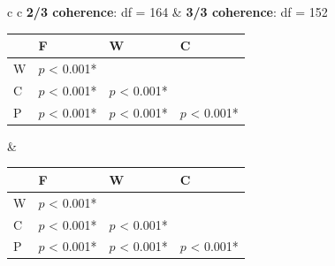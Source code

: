 \documentclass[man,floatsintext]{apa6}
\begin{document}
\begin{figure}[h]
\begin{center}
\begin{tabular}{ c c}
      \textbf{2/3 coherence}: df = 164 & \textbf{3/3 coherence}: df = 152\\

      {







        \small
        \begin{tabular}{| l | l |  l | l |}
          \hline
          & F                           & W                         & C \\ 
          \hline
          W &  $p$ < 0.001*  &                           &\\
          \hline
          C &  $p$ < 0.001*  &  $p$ < 0.001*  &\\
          \hline
          P &  $p$ < 0.001* &  $p$ < 0.001*  &  $p$ < 0.001*\\
          \hline
        \end{tabular}
      } & 

      {






        \small
        \begin{tabular}{| l | l |  l | l |}
          \hline
          & F                            & W                         & C \\ 
          \hline
          W &  $p$ < 0.001*  &                           &\\
          \hline
          C &  $p$ < 0.001*  &  $p$ < 0.001*   &\\
          \hline
          P &  $p$ < 0.001* &  $p$ < 0.001*  &  $p$ < 0.001*\\
          \hline
        \end{tabular}
      }\\


\end{tabular}
\end{center}
\end{figure}
\end{document}
